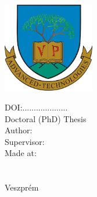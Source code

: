 \thispagestyle{empty}%
\begin{center}
    \myuni \\
    \myfaculty \\
    \myschool \\[0.6cm]
    \includegraphics[width=4cm]{img/MIK_cimer.jpg}\\[1.2cm]
    \begin{spacing}{2} \fontsize{25}{15}\textbf{ \textsc{\mytitle} }\end{spacing} %
    DOI:.................... \\[1.5cm]
    Doctoral (PhD) Thesis \\
    Author: \myauthor \\[1cm]
    Supervisor: \mysupervisor \\[1.5cm]
    Made at:\\ \myuni\\ \myschool  \\[1.5cm]
    Veszpr\'em \\
    \mydate
\end{center}

\newpage
\null
\thispagestyle{empty}%
\newpage 